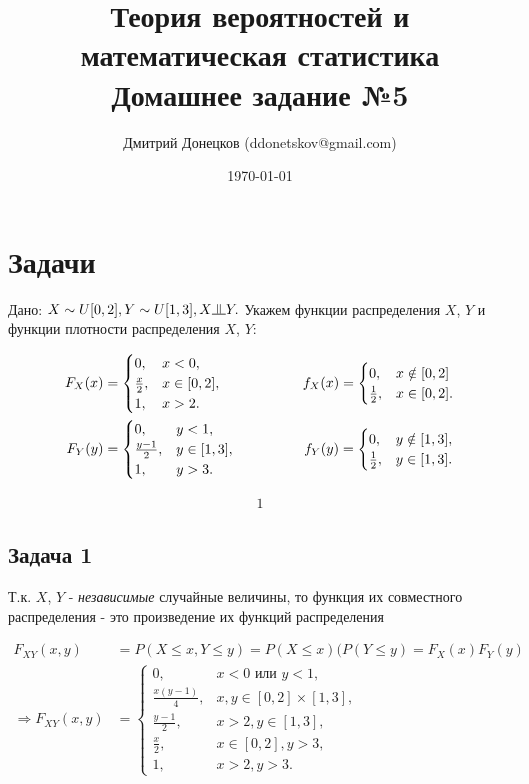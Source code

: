 \documentclass[a4paper,11pt]{article}
\title{\vspace{-1.5cm}Теория вероятностей и математическая статистика \\
Домашнее задание №5}
\author{Дмитрий Донецков (ddonetskov@gmail.com)}
\date{\today}
\newcommand{\independent}{\raisebox{0.05em}{\rotatebox[origin=c]{90}{$\models$}}}
\begin{document}
\maketitle

\section{Задачи}

Дано: $X \sim U[0,2], Y \sim U[1,3], X \independent Y.$ Укажем функции распределения $X$, $Y$ и функции плотности распределения $X$, $Y$:

\begin{align*}
F_X(x) & = 
\begin{cases}
  0,   & x < 0, \\
  \frac{x}{2}, & x \in [0,2], \\
  1,   & x > 2.
\end{cases}
\hspace{2cm}
f_X(x) = 
\begin{cases}
0, & x \notin [0,2] \\
\frac{1}{2}, & x \in [0,2].
\end{cases}
\\
F_Y(y) & = 
\begin{cases}
0,   & y < 1, \\
\frac{y-1}{2}, & y \in [1,3], \\
1,   & y > 3.
\end{cases}
\hspace{1.7cm}
f_Y(y) = 
\begin{cases}
0,   & y \notin [1,3], \\
\frac{1}{2}, & y \in [1,3].
\end{cases}
\end{align*}

\begin{align*}
1
\end{align*}

\subsection{Задача 1}

Т.к. $X$, $Y$ - \textit{независимые} случайные величины, то функция их совместного распределения - это произведение их функций распределения 

\begin{align*}
F_{XY}(x, y) & = P(X \leq x, Y \leq y) = P(X \leq x) (P(Y \leq y) = F_X(x) F_Y(y) \\
\Rightarrow
F_{XY}(x, y) & =
\begin{cases}
  0, & x < 0 \text{ или } y < 1, \\
  \frac{x(y-1)}{4}, & x, y \in [0,2]\times[1,3], \\
  \frac{y-1}{2}, & x > 2, y \in [1, 3], \\
  \frac{x}{2}, & x \in [0,2], y > 3, \\
  1, & x > 2, y > 3.
\end{cases}
\end{align*}
\end{document}
